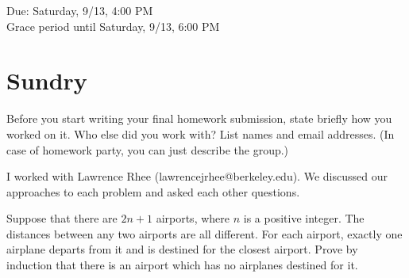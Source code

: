 \documentclass[11pt]{article}
\begin{document}
\maketitle
\fontsize{12}{15}\selectfont

\begin{center}
    Due: Saturday, 9/13, 4:00 PM \\
    Grace period until Saturday, 9/13, 6:00 PM \\
\end{center}

\section*{Sundry}
Before you start writing your final homework submission, state briefly how you worked on it.  Who else did you work with?  List names and email addresses.  (In case of homework party, you can just describe the group.)

\begin{solution}
    I worked with Lawrence Rhee (lawrencejrhee@berkeley.edu). 
    We discussed our approaches to each problem and asked each other questions.  
\end{solution}

\vspace{15pt}


Suppose that there are $2n+1$ airports, where $n$ is a positive integer. The distances between any two airports are all different. For each airport, exactly one airplane departs from it and is destined for the closest airport. Prove by induction that there is an airport which has no airplanes destined for it.
\end{document}
